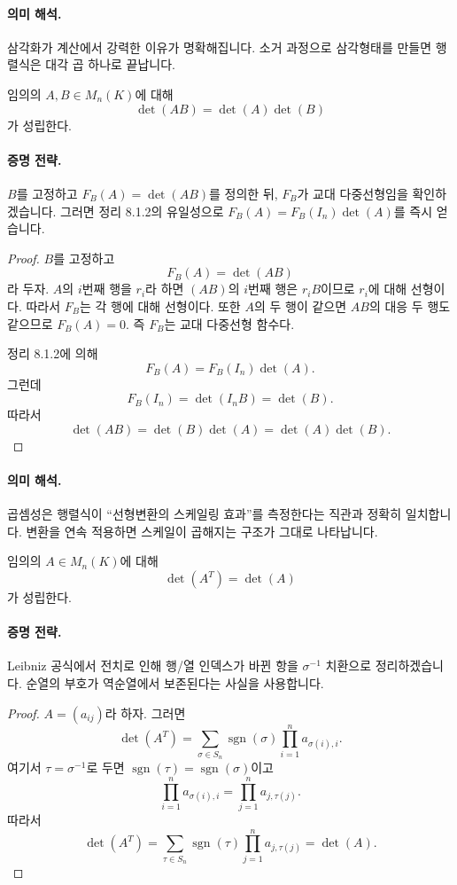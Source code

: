 \paragraph{의미 해석.}
삼각화가 계산에서 강력한 이유가 명확해집니다. 소거 과정으로 삼각형태를 만들면 행렬식은 대각 곱 하나로 끝납니다.

\begin{theorem}
임의의 $A,B\in M_n(K)$에 대해
$$
\det(AB)=\det(A)\det(B)
$$
가 성립한다.
\end{theorem}

\paragraph{증명 전략.}
$B$를 고정하고 $F_B(A)=\det(AB)$를 정의한 뒤, $F_B$가 교대 다중선형임을 확인하겠습니다. 그러면 정리 8.1.2의 유일성으로 $F_B(A)=F_B(I_n)\det(A)$를 즉시 얻습니다.

\begin{proof}
$B$를 고정하고
$$
F_B(A)=\det(AB)
$$
라 두자. $A$의 $i$번째 행을 $r_i$라 하면 $(AB)$의 $i$번째 행은 $r_iB$이므로 $r_i$에 대해 선형이다. 따라서 $F_B$는 각 행에 대해 선형이다. 또한 $A$의 두 행이 같으면 $AB$의 대응 두 행도 같으므로 $F_B(A)=0$. 즉 $F_B$는 교대 다중선형 함수다.

정리 8.1.2에 의해
$$
F_B(A)=F_B(I_n)\det(A).
$$
그런데
$$
F_B(I_n)=\det(I_nB)=\det(B).
$$
따라서
$$
\det(AB)=\det(B)\det(A)=\det(A)\det(B).
$$
\end{proof}

\paragraph{의미 해석.}
곱셈성은 행렬식이 ``선형변환의 스케일링 효과''를 측정한다는 직관과 정확히 일치합니다. 변환을 연속 적용하면 스케일이 곱해지는 구조가 그대로 나타납니다.

\begin{theorem}
임의의 $A\in M_n(K)$에 대해
$$
\det(A^T)=\det(A)
$$
가 성립한다.
\end{theorem}

\paragraph{증명 전략.}
Leibniz 공식에서 전치로 인해 행/열 인덱스가 바뀐 항을 $\sigma^{-1}$ 치환으로 정리하겠습니다. 순열의 부호가 역순열에서 보존된다는 사실을 사용합니다.

\begin{proof}
$A=(a_{ij})$라 하자. 그러면
$$
\det(A^T)=\sum_{\sigma\in S_n}\operatorname{sgn}(\sigma)\prod_{i=1}^n a_{\sigma(i),i}.
$$
여기서 $\tau=\sigma^{-1}$로 두면 $\operatorname{sgn}(\tau)=\operatorname{sgn}(\sigma)$이고
$$
\prod_{i=1}^n a_{\sigma(i),i}=\prod_{j=1}^n a_{j,\tau(j)}.
$$
따라서
$$
\det(A^T)=\sum_{\tau\in S_n}\operatorname{sgn}(\tau)\prod_{j=1}^n a_{j,\tau(j)}=\det(A).
$$
\end{proof}

